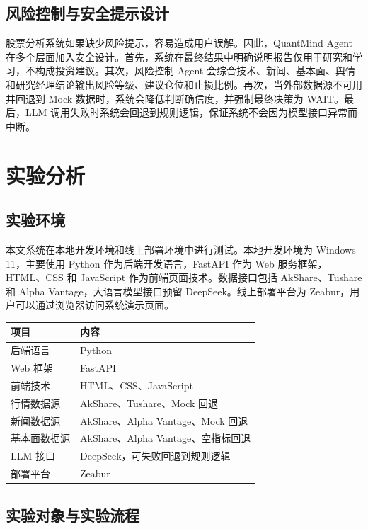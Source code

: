 \documentclass[UTF8,a4paper,12pt]{ctexart}
\begin{document}
\subsection{风险控制与安全提示设计}

股票分析系统如果缺少风险提示，容易造成用户误解。因此，QuantMind Agent 在多个层面加入安全设计。首先，系统在最终结果中明确说明报告仅用于研究和学习，不构成投资建议。其次，风险控制 Agent 会综合技术、新闻、基本面、舆情和研究经理结论输出风险等级、建议仓位和止损比例。再次，当外部数据源不可用并回退到 Mock 数据时，系统会降低判断确信度，并强制最终决策为 WAIT。最后，LLM 调用失败时系统会回退到规则逻辑，保证系统不会因为模型接口异常而中断。

\section{实验分析}

\subsection{实验环境}

本文系统在本地开发环境和线上部署环境中进行测试。本地开发环境为 Windows 11，主要使用 Python 作为后端开发语言，FastAPI 作为 Web 服务框架，HTML、CSS 和 JavaScript 作为前端页面技术。数据接口包括 AkShare、Tushare 和 Alpha Vantage，大语言模型接口预留 DeepSeek。线上部署平台为 Zeabur，用户可以通过浏览器访问系统演示页面。

\begin{center}
\begin{tabular}{ll}
\toprule
项目 & 内容 \\
\midrule
后端语言 & Python \\
Web 框架 & FastAPI \\
前端技术 & HTML、CSS、JavaScript \\
行情数据源 & AkShare、Tushare、Mock 回退 \\
新闻数据源 & AkShare、Alpha Vantage、Mock 回退 \\
基本面数据源 & AkShare、Alpha Vantage、空指标回退 \\
LLM 接口 & DeepSeek，可失败回退到规则逻辑 \\
部署平台 & Zeabur \\
\bottomrule
\end{tabular}
\end{center}

\subsection{实验对象与实验流程}
\end{document}
